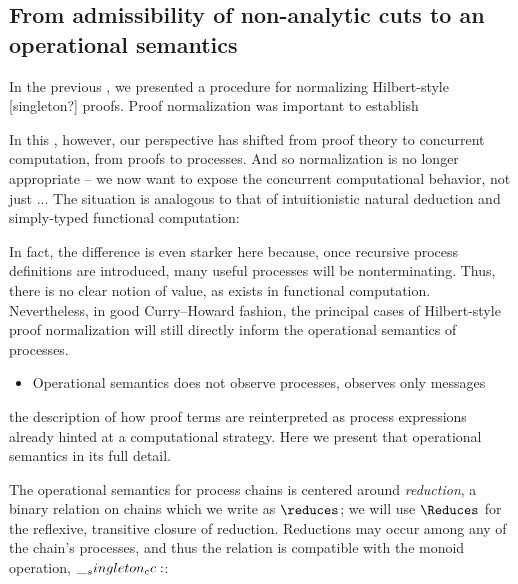 \quad
{}



\subsection{From admissibility of non-analytic cuts to an operational semantics}

In the previous , we presented a procedure for normalizing Hilbert-style [singleton?] proofs.
Proof normalization was important to establish

In this , however, our perspective has shifted from proof theory to concurrent computation, from proofs to processes.
And so normalization is no longer appropriate -- we now want to expose the concurrent computational behavior, not just ...
The situation is analogous to that of intuitionistic natural deduction and simply-typed functional computation:

In fact, the difference is even starker here because, once recursive process definitions are introduced, many useful processes will be nonterminating.
Thus, there is no clear notion of value, as exists in functional computation.
Nevertheless, in good Curry--Howard fashion, the principal cases of Hilbert-style proof normalization will still directly inform the operational semantics of processes.

\begin{itemize}
\item Operational semantics does not observe processes, observes only messages
\end{itemize}

 the description of how proof terms are reinterpreted as process expressions already hinted at a computational strategy.
Here we present that operational semantics in its full detail.


The operational semantics for process chains is centered around \emph{reduction}, a binary relation on chains which we write as $\reduces$;
we will use $\Reduces$ for the reflexive, transitive closure of reduction.
Reductions may occur among any of the chain's processes, and thus the relation is compatible with the monoid operation, $\__singleton_cc:$:

